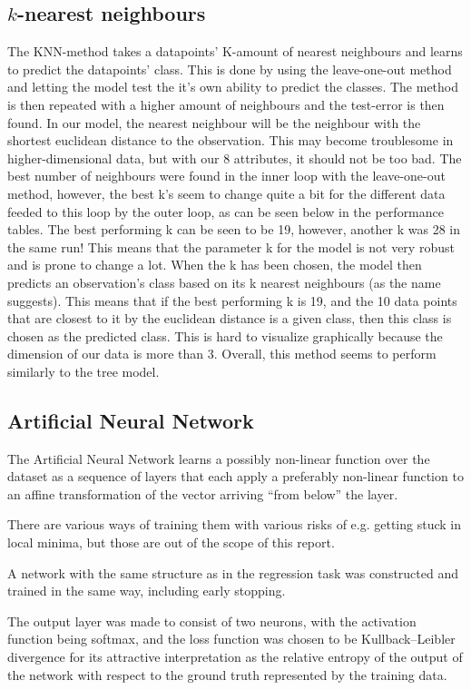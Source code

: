 \subsection{$k$-nearest neighbours}
The KNN-method takes a datapoints' K-amount of nearest neighbours and learns to predict the datapoints' class.
This is done by using the leave-one-out method and letting the model test the it's own ability to predict the classes.
The method is then repeated with a higher amount of neighbours and the test-error is then found. In our model, the nearest
neighbour will be the neighbour with the shortest euclidean distance to the observation.
This may become troublesome in higher-dimensional data, but with our 8 attributes, it should
not be too bad. The best number of neighbours were found in the inner loop with
the leave-one-out method, however, the best k's seem to change quite a bit for the
different data feeded to this loop by the outer loop, as can be seen below in the performance
tables. The best performing k can be seen to be 19, however, another k was
28 in the same run! This means that the parameter k for the model is not very
robust and is prone to change a lot. When the k has been chosen, the model then
predicts an observation's class based on its k nearest neighbours (as the
name suggests). This means that if the best performing k is 19, and the 10
data points that are closest to it by the euclidean distance is a given class,
then this class is chosen as the predicted class. This is hard to visualize
graphically because the dimension of our data is more than 3. Overall, this
method seems to perform similarly to the tree model.

\subsection{Artificial Neural Network}
The Artificial Neural Network learns a possibly non-linear function
over the dataset as a sequence of layers that each apply
a preferably non-linear function to an affine transformation of the vector arriving
``from below'' the layer.

There are various ways of training them with various risks of e.g.
getting stuck in local minima, but those are out of the scope of this report.

A network with the same structure as in the regression task was constructed and trained in the same way,
including early stopping.

The output layer was made to consist of two neurons,
with the activation function being softmax,
and the loss function was chosen to be Kullback–Leibler divergence
for its attractive interpretation as the relative entropy
of the output of the network with respect to the ground truth
represented by the training data.


